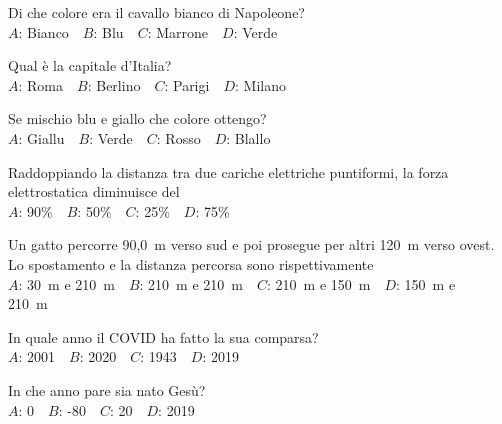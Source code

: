 \def\mcquestionnumber{1}


\mcquestionheader Di che colore era il cavallo bianco di Napoleone?\\
{$A$}: Bianco\ \ {$B$}: Blu\ \ {$C$}: Marrone\ \ {$D$}: Verde\ \ 

\mcquestionfooter



\def\mcquestionnumber{2}


\mcquestionheader Qual è la capitale d’Italia?\\
{$A$}: Roma\ \ {$B$}: Berlino\ \ {$C$}: Parigi\ \ {$D$}: Milano\ \ 

\mcquestionfooter



\def\mcquestionnumber{3}


\mcquestionheader Se mischio blu e giallo che colore ottengo?\\
{$A$}: Giallu\ \ {$B$}: Verde\ \ {$C$}: Rosso\ \ {$D$}: Blallo\ \ 

\mcquestionfooter



\def\mcquestionnumber{4}


\mcquestionheader Raddoppiando la distanza tra due cariche elettriche puntiformi, la forza elettrostatica diminuisce del\\
{$A$}: 90\%\ \ {$B$}: 50\%\ \ {$C$}: 25\%\ \ {$D$}: 75\%\ \ 

\mcquestionfooter



\def\mcquestionnumber{5}


\mcquestionheader Un gatto percorre 90,0~m verso sud e poi prosegue per altri 120~m verso ovest. Lo spostamento e la distanza percorsa sono rispettivamente\\
{$A$}: 30~m e 210~m\ \ {$B$}: 210~m e 210~m\ \ {$C$}: 210~m e 150~m\ \ {$D$}: 150~m e 210~m\ \ 

\mcquestionfooter



\def\mcquestionnumber{6}


\mcquestionheader In quale anno il COVID ha fatto la sua comparsa?\\
{$A$}: 2001\ \ {$B$}: 2020\ \ {$C$}: 1943\ \ {$D$}: 2019\ \ 

\mcquestionfooter



\def\mcquestionnumber{7}


\mcquestionheader In che anno pare sia nato Gesù?\\
{$A$}: 0\ \ {$B$}: -80\ \ {$C$}: 20\ \ {$D$}: 2019\ \ 

